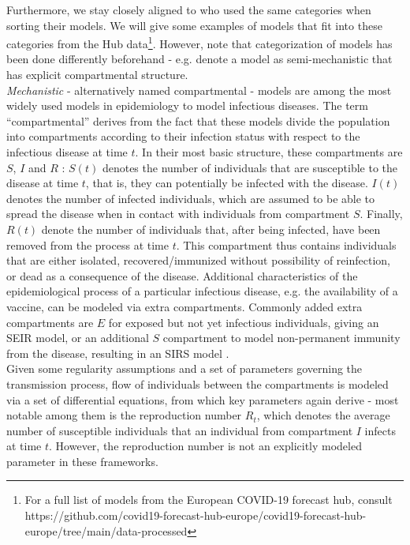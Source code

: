 Furthermore, we stay closely aligned to \cite{bracher_pre-registered_2021} who used the same categories when sorting their models. We will give some examples of models that fit into these categories from the Hub data\footnote{For a full list of models from the European COVID-19 forecast hub, consult https://github.com/covid19-forecast-hub-europe/covid19-forecast-hub-europe/tree/main/data-processed}. However, note that categorization of models has been done differently beforehand - e.g. \cite{funk_assessing_nodate} denote a model as semi-mechanistic that has explicit compartmental structure.\\
\textit{Mechanistic} - alternatively named compartmental - models are among the most widely used models in epidemiology to model infectious diseases. The term ``compartmental'' derives from the fact that these models divide the population into compartments according to their infection status with respect to the infectious disease at time $t$. In their most basic structure, these compartments are $S$, $I$ and $R$ \citep{brauer_epidemic_2012}: $S(t)$ denotes the number of individuals that are susceptible to the disease at time $t$, that is, they can potentially be infected with the disease. $I(t)$ denotes the number of infected individuals, which are assumed to be able to spread the disease when in contact with individuals from compartment $S$. Finally, $R(t)$ denote the number of individuals that, after being infected, have been removed from the process at time $t$. This compartment thus contains individuals that are either isolated, recovered/immunized without possibility of reinfection, or dead as a consequence of the disease. Additional characteristics of the epidemiological process of a particular infectious disease, e.g. the availability of a vaccine, can be modeled via extra compartments. Commonly added extra compartments are $E$ for exposed but not yet infectious individuals, giving an SEIR model, or an additional $S$ compartment to model non-permanent immunity from the disease, resulting in an SIRS model \citep{brauer_epidemic_2012}. \\
Given some regularity assumptions and a set of parameters governing the transmission process, flow of individuals between the compartments is modeled via a set of differential equations, from which key parameters again derive - most notable among them is the reproduction number $R_t$, which denotes the average number of susceptible individuals that an individual from compartment $I$ infects at time $t$. However, the reproduction number is not an explicitly modeled parameter in these frameworks. \medskip\\
